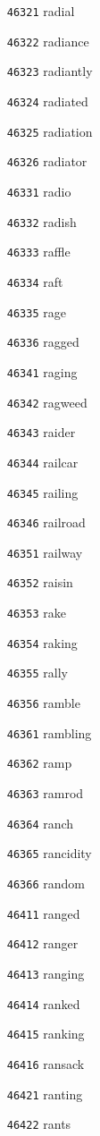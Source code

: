 \documentclass[twoside,11pt]{article}
\begin{document}
\begin{multicols}{5}
\begin{enumerate}
\item[\texttt{46321}] radial
\item[\texttt{46322}] radiance
\item[\texttt{46323}] radiantly
\item[\texttt{46324}] radiated
\item[\texttt{46325}] radiation
\item[\texttt{46326}] radiator
\item[\texttt{46331}] radio
\item[\texttt{46332}] radish
\item[\texttt{46333}] raffle
\item[\texttt{46334}] raft
\item[\texttt{46335}] rage
\item[\texttt{46336}] ragged
\item[\texttt{46341}] raging
\item[\texttt{46342}] ragweed
\item[\texttt{46343}] raider
\item[\texttt{46344}] railcar
\item[\texttt{46345}] railing
\item[\texttt{46346}] railroad
\item[\texttt{46351}] railway
\item[\texttt{46352}] raisin
\item[\texttt{46353}] rake
\item[\texttt{46354}] raking
\item[\texttt{46355}] rally
\item[\texttt{46356}] ramble
\item[\texttt{46361}] rambling
\item[\texttt{46362}] ramp
\item[\texttt{46363}] ramrod
\item[\texttt{46364}] ranch
\item[\texttt{46365}] rancidity
\item[\texttt{46366}] random
\item[\texttt{46411}] ranged
\item[\texttt{46412}] ranger
\item[\texttt{46413}] ranging
\item[\texttt{46414}] ranked
\item[\texttt{46415}] ranking
\item[\texttt{46416}] ransack
\item[\texttt{46421}] ranting
\item[\texttt{46422}] rants

\end{enumerate}
\end{multicols}
\end{document}
